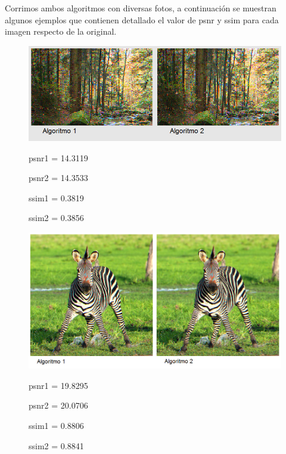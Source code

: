 \documentclass[a4paper]{article}
\begin{document}
Corrimos ambos algoritmos con diversas fotos, a continuaci\'on se muestran algunos ejemplos que contienen detallado el valor de psnr y ssim para cada imagen respecto de la original.

\begin{figure}[h!]
	\caption{}
	\begin{center}
	\includegraphics[scale=0.60]{imagenes/Vecino/arbolitos}
	\label{arbolitos}
	
	psnr1 =   14.3119

psnr2 =   14.3533

ssim1 =    0.3819

ssim2 =    0.3856
  \end{center}
\end{figure}

\begin{figure}[h!]
	\caption{}
	\begin{center}
	\includegraphics[scale=0.60]{imagenes/Vecino/zebraCara}
	\label{zebraCara}
	
	psnr1 =   19.8295

psnr2 =   20.0706

ssim1 =    0.8806

ssim2 =    0.8841
  \end{center}
\end{figure}
\end{document}
